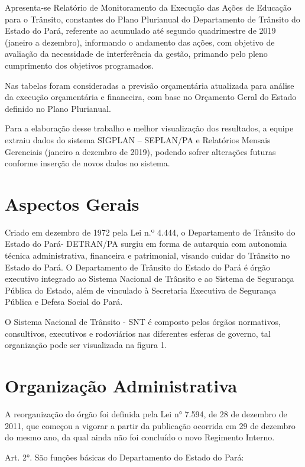 \documentclass[a4paper]{article}
\begin{document}
Apresenta-se Relatório de Monitoramento da Execução das Ações de Educação para o Trânsito, constantes do Plano Plurianual do Departamento de Trânsito do Estado do Pará, referente ao acumulado até segundo quadrimestre de 2019 (janeiro a dezembro), informando o andamento das ações, com objetivo de avaliação da necessidade de interferência da gestão, primando pelo pleno cumprimento dos objetivos programados.\vskip0.3cm

Nas tabelas foram consideradas a previsão orçamentária atualizada para análise da execução orçamentária e financeira, com base no Orçamento Geral do Estado definido no Plano Plurianual.\vskip0.3cm

Para a elaboração desse trabalho e melhor visualização dos resultados, a equipe extraiu dados do sistema SIGPLAN – SEPLAN/PA e Relatórios Mensais Gerenciais (janeiro a dezembro de 2019), podendo sofrer alterações futuras conforme inserção de novos dados no sistema.\vskip0.3cm




\section{Aspectos Gerais}

Criado em dezembro de 1972 pela Lei n.º 4.444, o Departamento de Trânsito do Estado do Pará- DETRAN/PA surgiu em forma de autarquia com autonomia técnica administrativa, financeira e patrimonial, visando cuidar do Trânsito no Estado do Pará. O Departamento de Trânsito do Estado do Pará é órgão executivo integrado ao Sistema Nacional de Trânsito e ao Sistema de Segurança Pública do Estado, além de vinculado à Secretaria Executiva de Segurança Pública e Defesa Social do Pará.\vskip0.3cm

O Sistema Nacional de Trânsito - SNT é composto pelos órgãos normativos, consultivos, executivos e rodoviários nas diferentes esferas de governo, tal organização pode ser visualizada na figura 1.\vskip0.3cm


\section{Organização Administrativa}


A reorganização do órgão foi definida pela Lei n° 7.594, de 28 de dezembro de 2011, que começou a vigorar a partir da publicação ocorrida em 29 de dezembro do mesmo ano, da qual ainda não foi concluído o novo Regimento Interno.\vskip0.3cm

Art. 2°. São funções básicas do Departamento do Estado do Pará:\vskip0.3cm
\end{document}
